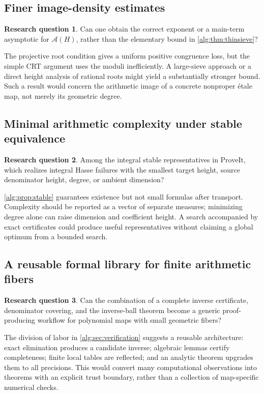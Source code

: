 \documentclass[11pt]{article}
\numberwithin{equation}{section}
\theoremstyle{plain}
\theoremstyle{plain}
\theoremstyle{plain}
\theoremstyle{definition}
\theoremstyle{definition}
\newtheorem{question}[question]{Research question}
\theoremstyle{definition}
\theoremstyle{remark}
\begin{document}
\subsection{Finer image-density estimates}
\begin{question}
Can one obtain the correct exponent or a main-term asymptotic for
$\mathcal A(H)$, rather than the elementary bound in
\cref{alg:thm:thinsieve}?
\end{question}
The projective root condition gives a uniform positive congruence loss,
but the simple CRT argument uses the moduli inefficiently. A large-sieve
approach or a direct height analysis of rational roots might yield a
substantially stronger bound. Such a result would concern the arithmetic
image of a concrete nonproper \'etale map, not merely its geometric degree.

\subsection{Minimal arithmetic complexity under stable equivalence}
\begin{question}
Among the integral stable representatives in ProveIt, which realizes
integral Hasse failures with the smallest target height, source denominator
height, degree, or ambient dimension?
\end{question}
\cref{alg:prop:stable} guarantees existence but not small formulas after
transport. Complexity should be reported as a vector of separate
measures; minimizing degree alone can raise dimension and coefficient
height. A search accompanied by exact certificates could produce useful
representatives without claiming a global optimum from a bounded search.

\subsection{A reusable formal library for finite arithmetic fibers}\label{alg:sub:q-library}
\begin{question}
Can the combination of a complete inverse certificate, denominator
covering, and the inverse-ball theorem become a generic proof-producing
workflow for polynomial maps with small geometric fibers?
\end{question}
The division of labor in \cref{alg:sec:verification} suggests a reusable
architecture: exact elimination produces a candidate inverse; algebraic
lemmas certify completeness; finite local tables are reflected; and an
analytic theorem upgrades them to all precisions. This would convert
many computational observations into theorems with an explicit trust
boundary, rather than a collection of map-specific numerical checks.
\end{document}
